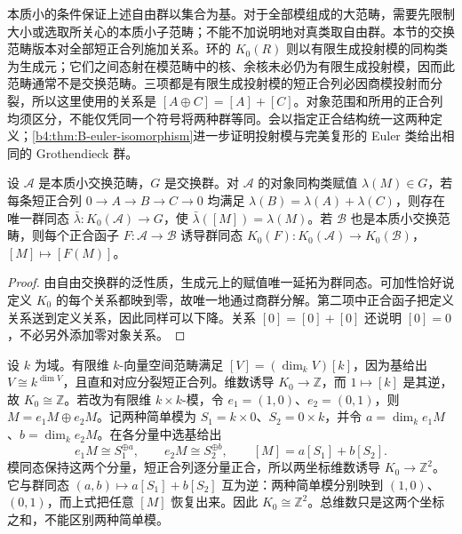 本质小的条件保证上述自由群以集合为基。对于全部模组成的大范畴，需要先限制大小或选取所关心的本质小子范畴；不能不加说明地对真类取自由群。本节的交换范畴版本对全部短正合列施加关系。环的 \(K_0(R)\) 则以有限生成投射模的同构类为生成元；它们之间态射在模范畴中的核、余核未必仍为有限生成投射模，因而此范畴通常不是交换范畴。三项都是有限生成投射模的短正合列必因商模投射而分裂，所以这里使用的关系是 \([A\oplus C]=[A]+[C]\)。对象范围和所用的正合列均须区分，不能仅凭同一个符号将两种群等同。会以指定正合结构统一这两种定义；\cref{b4:thm:B-euler-isomorphism}进一步证明投射模与完美复形的 Euler 类给出相同的 Grothendieck 群。

\begin{proposition}\label{b4:prop:grothendieck-universal}
	设 \(\mathcal A\) 是本质小交换范畴，\(G\) 是交换群。对 \(\mathcal A\) 的对象同构类赋值 \(\lambda(M)\in G\)，若每条短正合列 \(0\to A\to B\to C\to0\) 均满足 \(\lambda(B)=\lambda(A)+\lambda(C)\)，则存在唯一群同态 \(\bar\lambda:K_0(\mathcal A)\to G\)，使 \(\bar\lambda([M])=\lambda(M)\)。若 \(\mathcal B\) 也是本质小交换范畴，则每个正合函子 \(F:\mathcal A\to\mathcal B\) 诱导群同态 \(K_0(F):K_0(\mathcal A)\to K_0(\mathcal B)\)，\([M]\mapsto[F(M)]\)。
\end{proposition}
\begin{proof}
	由自由交换群的泛性质，生成元上的赋值唯一延拓为群同态。可加性恰好说定义 \(K_0\) 的每个关系都映到零，故唯一地通过商群分解。第二项中正合函子把定义关系送到定义关系，因此同样可以下降。关系 \([0]=[0]+[0]\) 还说明 \([0]=0\)，不必另外添加零对象关系。
\end{proof}

\begin{example}\label{b4:exm:kzero-vectors}
	设 \(k\) 为域。有限维 \(k\)-向量空间范畴满足 \([V]=(\dim_kV)[k]\)，因为基给出 \(V\cong k^{\dim V}\)，且直和对应分裂短正合列。维数诱导 \(K_0\to\mathbb Z\)，而 \(1\mapsto[k]\) 是其逆，故 \(K_0\cong\mathbb Z\)。若改为有限维 \(k\times k\)-模，令 \(e_1=(1,0)\)、\(e_2=(0,1)\)，则 \(M=e_1M\oplus e_2M\)。记两种简单模为 \(S_1=k\times0\)、\(S_2=0\times k\)，并令 \(a=\dim_k e_1M\)、\(b=\dim_k e_2M\)。在各分量中选基给出
	\[
		e_1M\cong S_1^{\oplus a},\qquad e_2M\cong S_2^{\oplus b},\qquad [M]=a[S_1]+b[S_2].
	\]
	模同态保持这两个分量，短正合列逐分量正合，所以两坐标维数诱导 \(K_0\to\mathbb Z^2\)。它与群同态 \((a,b)\mapsto a[S_1]+b[S_2]\) 互为逆：两种简单模分别映到 \((1,0)\)、\((0,1)\)，而上式把任意 \([M]\) 恢复出来。因此 \(K_0\cong\mathbb Z^2\)。总维数只是这两个坐标之和，不能区别两种简单模。
\end{example}

